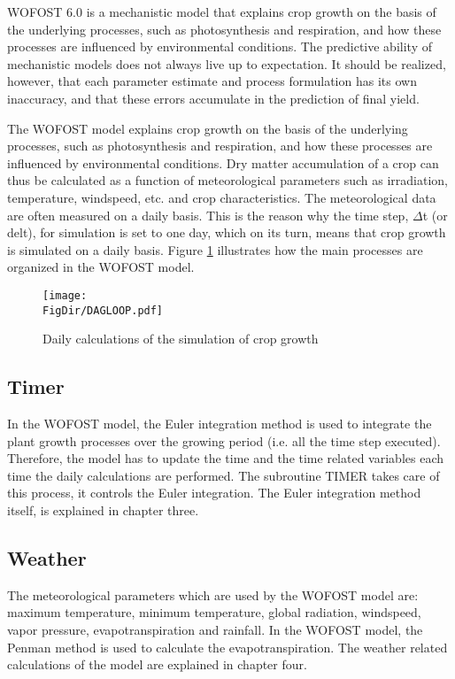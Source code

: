 WOFOST 6.0 is a mechanistic model that explains crop growth on the basis of the 
underlying processes, such as photosynthesis and respiration, and how these processes are
influenced by environmental conditions. The predictive ability of mechanistic models does
not always live up to expectation. It should be realized, however, that each parame\-ter
estimate and process formulation has its own inaccura\-cy, and that these errors accumulate
in the prediction of final yield.

The WOFOST model explains crop growth on the basis of the underly\-ing processes, such
as photosynthesis and respira\-tion, and how these processes are influenced by environ\-mental 
conditions. Dry matter accumulation of a crop can thus be calculated as a function
of meteorological parameters such as irradiation, temperature, windspeed, etc. and crop
characteristics. The meteorological data are often measured on a daily basis. This is the
reason why the time step, $\Delta$t (or delt), for simulation is set to one day, which on its turn,
means that crop growth is simulated on a daily basis. Figure \ref{fig:DailySimLoop} illustrates 
how the main processes are organized in the WOFOST model.

\begin{figure}[htbp]
\centering
\texttt{[image: \\FigDir/DAGLOOP.pdf]}
\caption{Daily calculations of the simulation of crop growth}
\label{fig:DailySimLoop}
\end{figure}

\subsection{Timer}
In the WOFOST model, the Euler integration method is used to integrate the plant growth
processes over the growing period (i.e. all the time step executed). Therefore, the model
has to update the time and the time related variables each time the daily calcula\-tions are
performed. The subroutine TIMER takes care of this process, it controls the Euler
integration. The Euler integration method itself, is explained in chapter three.

\subsection{Weather}
The meteorological parameters which are used by the WOFOST model are: maxi\-mum
temperature, minimum temperature, global radiation, windspeed, vapor pressure,
evapotranspiration and rainfall. In the WOFOST model, the Penman method is used to
calculate the evapotr\-anspiration. The weather related calculations of the model are
explained in chapter four.

